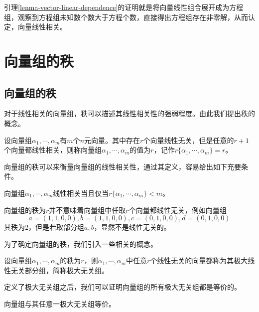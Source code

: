引理\ref{lenma-vector-linear-dependence}的证明就是将向量线性组合展开成为方程组，观察到方程组未知数个数大于方程个数，直接得出方程组存在非零解，从而认定，向量线性相关。

\section{向量组的秩}

\subsection{向量组的秩}

对于线性相关的向量组，秩可以描述其线性相关性的强弱程度。由此我们提出秩的概念。

\begin{definition}
    \label{def-vector-group-rank}
    设向量组$\alpha_1,\cdots,\alpha_m$有$m$个$n$元向量。其中存在$r$个向量线性无关，但是任意的$r+1$个向量都线性相关，则称向量组$\alpha_1,\cdots,\alpha_m$的值为$r$，记作$r\{\alpha_1,\cdots,\alpha_m\}=r$。
\end{definition}

向量组的秩可以来衡量向量组的线性相关性，通过其定义，容易给出如下充要条件。

\begin{thm}
    \label{thm-vector-group-dependence-rank}
    向量组$\alpha_1,\cdots,\alpha_m$线性相关当且仅当$r\{\alpha_1,\cdots,\alpha_m\}<m$。
\end{thm}

\begin{remark}
    向量组的秩为$r$并不意味着向量组中任取$r$个向量都线性无关，例如向量组
    \[
        a=(1,1,0,0),b=(1,1,0,0),c=(0,1,0,0),d=(0,1,0,0)
    \]
    其秩为$2$，但是若取部分组$a,b$，显然不是线性无关的。
\end{remark}

为了确定向量组的秩，我们引入一些相关的概念。

\begin{definition}
    \label{def-max-independence-group}
    设向量组$\alpha_1,\cdots,\alpha_m$的秩为$r$，则$\alpha_1,\cdots,\alpha_m$中任意$r$个线性无关的向量都称为其极大线性无关部分组，简称极大无关组。
\end{definition}

定义了极大无关组之后，我们可以证明向量组的所有极大无关组都是等价的。

\begin{property}
    \label{property-equvilent-mig}
    向量组与其任意一极大无关组等价。
\end{property}

